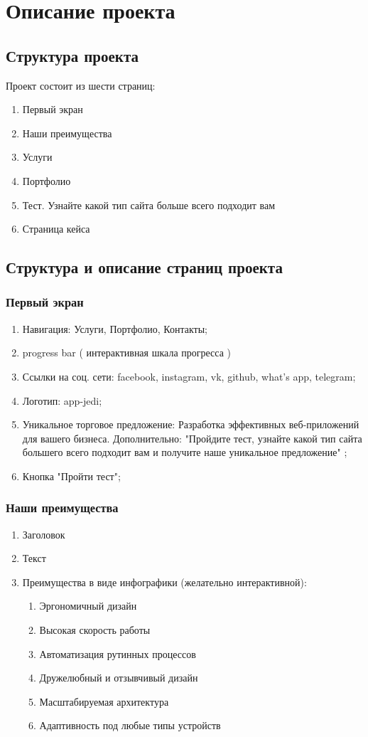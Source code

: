 \section{Описание проекта}
\subsection{Структура проекта}
Проект состоит из шести страниц:
\begin{enumerate}
  \item Первый экран
  \item Наши преимущества
  \item Услуги
  \item Портфолио
  \item Тест. Узнайте какой тип сайта больше всего подходит вам
  \item Страница кейса
\end{enumerate}
\subsection{Структура и описание страниц проекта}

\subsubsection{Первый экран}
\begin{enumerate}
  \item Навигация: Услуги, Портфолио, Контакты;
  \item progress bar ( интерактивная шкала прогресса )
  \item Ссылки на соц. сети: facebook, instagram, vk, github, what's app, telegram;
  \item Логотип: app-jedi;
  \item Уникальное торговое предложение: Разработка эффективных веб-приложений для вашего бизнеса. Дополнительно: "Пройдите тест, узнайте какой тип сайта большего всего подходит вам и получите наше уникальное предложение" ;
  \item Кнопка "Пройти тест";
\end{enumerate}

\subsubsection{Наши преимущества}
\begin{enumerate}
  \item Заголовок
  \item Текст
  \item Преимущества в виде инфографики (желательно интерактивной):
  \begin{enumerate}
    \item Эргономичный дизайн
    \item Высокая скорость работы
    \item Автоматизация рутинных процессов
    \item Дружелюбный и отзывчивый дизайн
    \item Масштабируемая архитектура
    \item Адаптивность под любые типы устройств
  \end{enumerate}
\end{enumerate}

